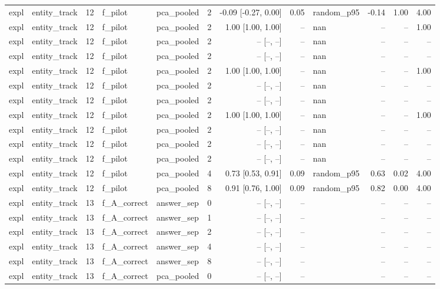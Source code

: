 \begin{tabular}{llrllrrrlrrr}
expl & entity\_track & 12 & f\_pilot & pca\_pooled & 2 & -0.09 [-0.27, 0.00] & 0.05 & random\_p95 & -0.14 & 1.00 & 4.00 \\
expl & entity\_track & 12 & f\_pilot & pca\_pooled & 2 & 1.00 [1.00, 1.00] & -- & nan & -- & -- & 1.00 \\
expl & entity\_track & 12 & f\_pilot & pca\_pooled & 2 & -- [--, --] & -- & nan & -- & -- & -- \\
expl & entity\_track & 12 & f\_pilot & pca\_pooled & 2 & -- [--, --] & -- & nan & -- & -- & -- \\
expl & entity\_track & 12 & f\_pilot & pca\_pooled & 2 & 1.00 [1.00, 1.00] & -- & nan & -- & -- & 1.00 \\
expl & entity\_track & 12 & f\_pilot & pca\_pooled & 2 & -- [--, --] & -- & nan & -- & -- & -- \\
expl & entity\_track & 12 & f\_pilot & pca\_pooled & 2 & -- [--, --] & -- & nan & -- & -- & -- \\
expl & entity\_track & 12 & f\_pilot & pca\_pooled & 2 & 1.00 [1.00, 1.00] & -- & nan & -- & -- & 1.00 \\
expl & entity\_track & 12 & f\_pilot & pca\_pooled & 2 & -- [--, --] & -- & nan & -- & -- & -- \\
expl & entity\_track & 12 & f\_pilot & pca\_pooled & 2 & -- [--, --] & -- & nan & -- & -- & -- \\
expl & entity\_track & 12 & f\_pilot & pca\_pooled & 2 & -- [--, --] & -- & nan & -- & -- & -- \\
expl & entity\_track & 12 & f\_pilot & pca\_pooled & 4 & 0.73 [0.53, 0.91] & 0.09 & random\_p95 & 0.63 & 0.02 & 4.00 \\
expl & entity\_track & 12 & f\_pilot & pca\_pooled & 8 & 0.91 [0.76, 1.00] & 0.09 & random\_p95 & 0.82 & 0.00 & 4.00 \\
expl & entity\_track & 13 & f\_A\_correct & answer\_sep & 0 & -- [--, --] & -- &  & -- & -- & -- \\
expl & entity\_track & 13 & f\_A\_correct & answer\_sep & 1 & -- [--, --] & -- &  & -- & -- & -- \\
expl & entity\_track & 13 & f\_A\_correct & answer\_sep & 2 & -- [--, --] & -- &  & -- & -- & -- \\
expl & entity\_track & 13 & f\_A\_correct & answer\_sep & 4 & -- [--, --] & -- &  & -- & -- & -- \\
expl & entity\_track & 13 & f\_A\_correct & answer\_sep & 8 & -- [--, --] & -- &  & -- & -- & -- \\
expl & entity\_track & 13 & f\_A\_correct & pca\_pooled & 0 & -- [--, --] & -- &  & -- & -- & -- \\

\end{tabular}
